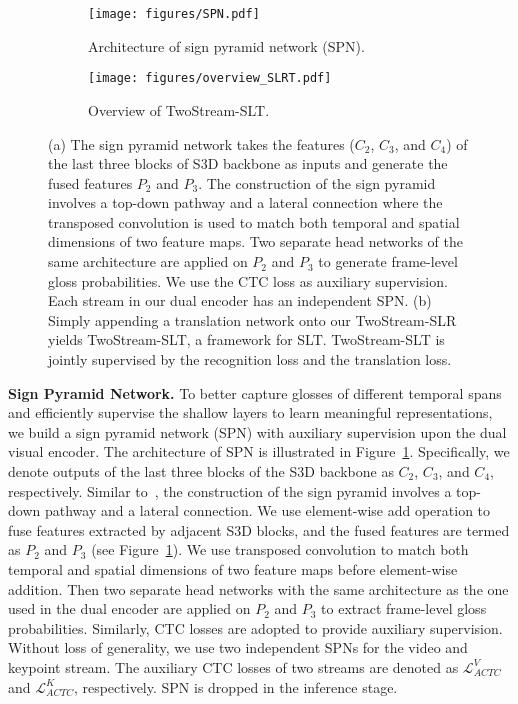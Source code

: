 \documentclass{article}
\begin{document}
\begin{figure}[t]
     \begin{subfigure}{.615\textwidth}
         \centering
         \texttt{[image: figures/SPN.pdf]}
         \caption{Architecture of sign pyramid network (SPN).}
         \label{fig:SPN}
     \end{subfigure}
\hfill
\begin{subfigure}{.365\textwidth}
  \centering
  \texttt{[image: figures/overview\_SLRT.pdf]}
  \caption{Overview of TwoStream-SLT.}
  \label{fig:TSN-SLRT}
\end{subfigure}
\caption{(a) The sign pyramid network takes the features ($C_2$, $C_3$, and $C_4$) of the last three blocks of S3D backbone as inputs and generate the fused features $P_2$ and $P_3$. The construction of the sign pyramid involves a top-down pathway and a lateral connection where the transposed convolution is used to match both temporal and spatial dimensions of two feature maps. Two separate head networks of the same architecture are applied on $P_2$ and $P_3$ to generate frame-level gloss probabilities. We use the CTC loss as auxiliary supervision. Each stream in our dual encoder has an independent SPN. (b) Simply appending a translation network onto our TwoStream-SLR yields TwoStream-SLT, a framework for SLT. TwoStream-SLT is jointly supervised by the recognition loss and the translation loss.}
\label{fig:spn_tsn_slrt}
\end{figure}

\textbf{Sign Pyramid Network.}
To better capture glosses of different temporal spans and efficiently supervise the shallow layers to learn meaningful representations, we build a sign pyramid network (SPN) with auxiliary supervision upon the dual visual encoder. The architecture of SPN is illustrated in Figure~\ref{fig:SPN}. Specifically, we denote outputs of the last three blocks of the S3D backbone as $C_2$, $C_3$, and $C_4$, respectively. Similar to~\cite{yang2020temporal}, the construction of the sign pyramid involves a top-down pathway and a lateral connection. We use element-wise add operation to fuse features extracted by adjacent S3D blocks, and the fused features are termed as $P_2$ and $P_3$ (see Figure~\ref{fig:SPN}). We use transposed convolution to match both temporal and spatial dimensions of two feature maps before element-wise addition. Then two separate head networks with the same architecture as the one used in the dual encoder are applied on $P_2$ and $P_3$ to extract frame-level gloss probabilities. Similarly, CTC losses are adopted to provide auxiliary supervision. Without loss of generality, we use two independent SPNs for the video and keypoint stream. The auxiliary CTC losses of two streams are denoted as $\mathcal{L}^{V}_{ACTC}$ and $\mathcal{L}^{K}_{ACTC}$, respectively. SPN is dropped in the inference stage.
\end{document}
